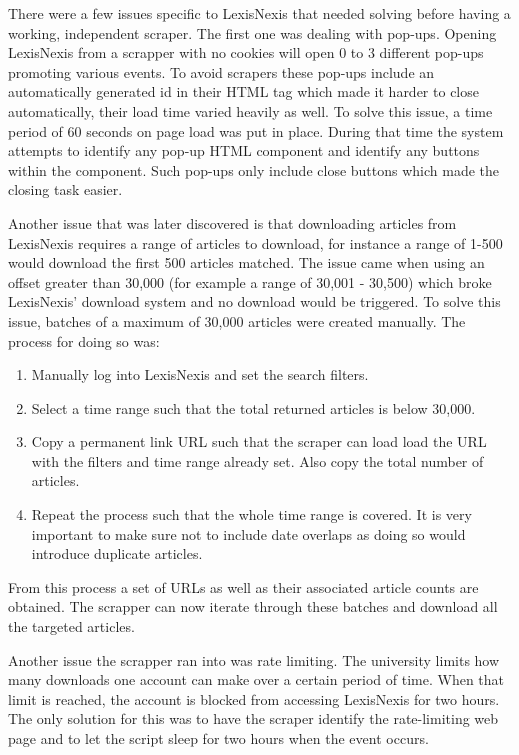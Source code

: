 There were a few issues specific to LexisNexis that needed solving before having a working, independent scraper. The first one was dealing with pop-ups. Opening LexisNexis from a scrapper with no cookies will open 0 to 3 different pop-ups promoting various events. To avoid scrapers these pop-ups include an automatically generated id in their HTML tag which made it harder to close automatically, their load time varied heavily as well. To solve this issue, a time period of 60 seconds on page load was put in place. During that time the system attempts to identify any pop-up HTML component and identify any buttons within the component. Such pop-ups only include close buttons which made the closing task easier.

Another issue that was later discovered is that downloading articles from LexisNexis requires a range of articles to download, for instance a range of 1-500 would download the first 500 articles matched. The issue came when using an offset greater than 30,000 (for example a range of 30,001 - 30,500) which broke LexisNexis' download system and no download would be triggered. To solve this issue, batches of a maximum of 30,000 articles were created manually. The process for doing so was:
\begin{enumerate}
    \item Manually log into LexisNexis and set the search filters.
    \item Select a time range such that the total returned articles is below 30,000.
    \item Copy a permanent link URL such that the scraper can load load the URL with the filters and time range already set. Also copy the total number of articles.
    \item Repeat the process such that the whole time range is covered. It is very important to make sure not to include date overlaps as doing so would introduce duplicate articles.
\end{enumerate}

From this process a set of URLs as well as their associated article counts are obtained. The scrapper can now iterate through these batches and download all the targeted articles.

Another issue the scrapper ran into was rate limiting. The university limits how many downloads one account can make over a certain period of time. When that limit is reached, the account is blocked from accessing LexisNexis for two hours. The only solution for this was to have the scraper identify the rate-limiting web page and to let the script sleep for two hours when the event occurs.

